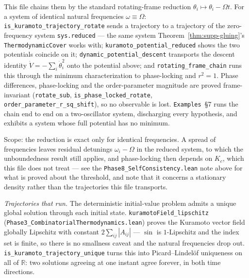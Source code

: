 \documentclass{article}
\begin{document}
This file chains them by the standard rotating-frame reduction $\theta_i \mapsto \theta_i - \Omega t$. For a system of identical natural frequencies $\omega \equiv \Omega$: \nolinkurl{is_kuramoto_trajectory_rotate} sends a trajectory to a trajectory of the zero-frequency system \texttt{sys.reduced} --- the same system Theorem~\ref{thm:supp-gluing}'s \texttt{ThermodynamicCover} works with; \nolinkurl{kuramoto_potential_reduced} shows the two potentials coincide on it; \nolinkurl{dynamic_potential_descent} transports the descent identity $\dot V = -\sum_i \dot\theta_i^2$ onto the potential above; and \nolinkurl{rotating_frame_chain} runs this through the minimum characterization to phase-locking and $r^2 = 1$. Phase differences, phase-locking and the order-parameter magnitude are proved frame-invariant (\nolinkurl{rotate_sub}, \nolinkurl{is_phase_locked_rotate}, \nolinkurl{order_parameter_r_sq_shift}), so no observable is lost. \texttt{Examples}~\S7 runs the chain end to end on a two-oscillator system, discharging every hypothesis, and exhibits a system whose full potential has no minimum.

Scope: the reduction is exact only for identical frequencies. A spread of frequencies leaves residual detunings $\omega_i - \Omega$ in the reduced system, to which the unboundedness result still applies, and phase-locking then depends on $K_c$, which this file does not treat --- see the \nolinkurl{Phase8_SelfConsistency.lean} note above for what is proved about the threshold, and note that it concerns a stationary density rather than the trajectories this file transports.

\textit{Trajectories that run.} The deterministic initial-value problem admits a unique global solution through each initial state. \nolinkurl{kuramotoField_lipschitz} (\nolinkurl{Phase3_CombinatorialThermodynamics.lean}) proves the Kuramoto vector field globally Lipschitz with constant $2\sum_{ij}|A_{ij}|$ --- $\sin$ is $1$-Lipschitz and the index set is finite, so there is no smallness caveat and the natural frequencies drop out. \nolinkurl{is_kuramoto_trajectory_unique} turns this into Picard--Lindel\"of uniqueness on all of $\mathbb{R}$: two solutions agreeing at one instant agree forever, in both time directions.
\end{document}
